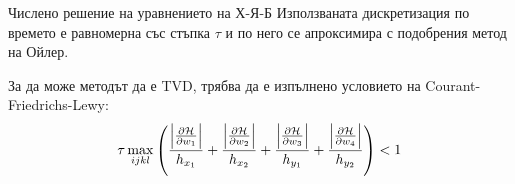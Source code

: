 \begin{frame}[t]{Числено решение на уравнението на Х-Я-Б}
  Използваната дискретизация по времето е равномерна със стъпка $\tau$ и по него се апроксимира с подобрения метод на Ойлер.

  За да може методът да е TVD, трябва да е изпълнено условието на Courant-Friedrichs-Lewy:
  \begin{equation*}
    \tau \max_{ijkl} \left(\frac{\abs{\pdv{\mathcal{H}}{w_1}}}{h_{x_1}} + \frac{\abs{\pdv{\mathcal{H}}{w_2}}}{h_{x_2}} + \frac{\abs{\pdv{\mathcal{H}}{w_3}}}{h_{y_1}} + \frac{\abs{\pdv{\mathcal{H}}{w_4}}}{h_{y_2}}\right) < 1
  \end{equation*}
\end{frame}
